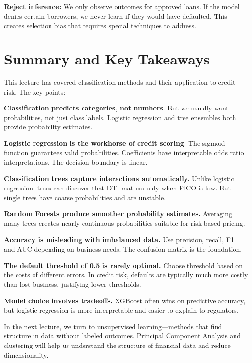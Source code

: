 \documentclass[11pt,a4paper]{article}
\begin{document}
\textbf{Reject inference:} We only observe outcomes for approved loans. If the model denies certain borrowers, we never learn if they would have defaulted. This creates selection bias that requires special techniques to address.

\section{Summary and Key Takeaways}

This lecture has covered classification methods and their application to credit risk. The key points:

\textbf{Classification predicts categories, not numbers.} But we usually want probabilities, not just class labels. Logistic regression and tree ensembles both provide probability estimates.

\textbf{Logistic regression is the workhorse of credit scoring.} The sigmoid function guarantees valid probabilities. Coefficients have interpretable odds ratio interpretations. The decision boundary is linear.

\textbf{Classification trees capture interactions automatically.} Unlike logistic regression, trees can discover that DTI matters only when FICO is low. But single trees have coarse probabilities and are unstable.

\textbf{Random Forests produce smoother probability estimates.} Averaging many trees creates nearly continuous probabilities suitable for risk-based pricing.

\textbf{Accuracy is misleading with imbalanced data.} Use precision, recall, F1, and AUC depending on business needs. The confusion matrix is the foundation.

\textbf{The default threshold of 0.5 is rarely optimal.} Choose threshold based on the costs of different errors. In credit risk, defaults are typically much more costly than lost business, justifying lower thresholds.

\textbf{Model choice involves tradeoffs.} XGBoost often wins on predictive accuracy, but logistic regression is more interpretable and easier to explain to regulators.

In the next lecture, we turn to unsupervised learning---methods that find structure in data without labeled outcomes. Principal Component Analysis and clustering will help us understand the structure of financial data and reduce dimensionality.
\end{document}
